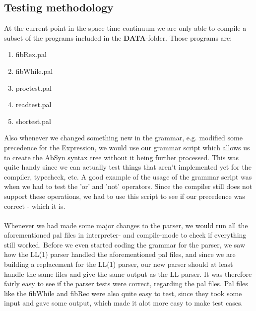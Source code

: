 \subsection{Testing methodology}
At the current point in the space-time continuum we are only able to compile a
subset of the programs included in the \textbf{DATA}-folder. Those programs
are:\\
\begin{enumerate}
  \item fibRex.pal
  \item fibWhile.pal
  \item proctest.pal
  \item readtest.pal
  \item shortest.pal
\end{enumerate}

Also whenever we changed something new in the grammar, e.g. modified some
precedence for the Expression, we would use our grammar script which allows us
to create the AbSyn syntax tree without it being further processed. This was
quite handy since we can actually test things that aren't implemented yet for
the compiler, typecheck, etc. A good example of the usage of the grammar script
was when we had to test the 'or' and 'not' operators. Since the compiler still
does not support these operations, we had to use this script to see if our
precedence was correct - which it is.
\\
\\
Whenever we had made some major changes to the parser, we would run all the
aforementioned pal files in interpreter- and compile-mode to check if everything
still worked. Before we even started coding the grammar for the parser, we saw
how the LL(1) parser handled the aforementioned pal files, and since we are
building a replacement for the LL(1) parser, our new parser should at least
handle the same files and give the same output as the LL parser. It was
therefore fairly easy to see if the parser tests were correct, regarding the pal
files. Pal files like the fibWhile and fibRec were also quite easy to test,
since they took some input and gave some output, which made it alot more easy to
make test cases.

